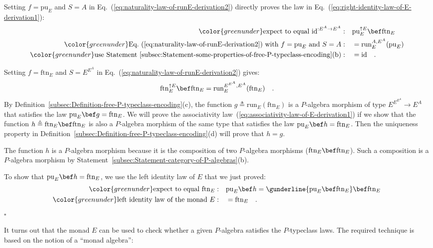 Setting $f=\text{pu}_{E}$ and $S=A$ in Eq.~(\ref{eq:naturality-law-of-runE-derivation2})
directly proves the law in Eq.~(\ref{eq:right-identity-law-of-E-derivation1}):
\begin{align*}
{\color{greenunder}\text{expect to equal }\text{id}^{:E^{A}\rightarrow E^{A}}:}\quad & \text{pu}_{E}^{\uparrow E}\bef\text{ftn}_{E}\\
{\color{greenunder}\text{Eq.~(\ref{eq:naturality-law-of-runE-derivation2}) with }f=\text{pu}_{E}\text{ and }S=A:}\quad & =\text{run}_{E}^{A,E^{A}}(\text{pu}_{E})\\
{\color{greenunder}\text{use Statement~\ref{subsec:Statement-some-properties-of-free-P-typeclass-encoding}(b)}:}\quad & =\text{id}\quad.
\end{align*}

Setting $f=\text{ftn}_{E}$ and $S=E^{E^{A}}$ in Eq.~(\ref{eq:naturality-law-of-runE-derivation2})
gives:
\[
\text{ftn}_{E}^{\uparrow E}\bef\text{ftn}_{E}=\text{run}_{E}^{E^{E^{A}},E^{A}}(\text{ftn}_{E})\quad.
\]
By Definition~\ref{subsec:Definition-free-P-typeclass-encoding}(c),
the function $g\triangleq\text{run}_{E}(\text{ftn}_{E})$ is a $P$-algebra
morphism of type $E^{E^{E^{A}}}\rightarrow E^{A}$ that satisfies
the law $\text{pu}_{E}\bef g=\text{ftn}_{E}$. We will prove the associativity
law~(\ref{eq:associativity-law-of-E-derivation1}) if we show that
the function $h\triangleq\text{ftn}_{E}\bef\text{ftn}_{E}$ is also
a $P$-algebra morphism of the same type that satisfies the law $\text{pu}_{E}\bef h=\text{ftn}_{E}$.
Then the uniqueness property in Definition~\ref{subsec:Definition-free-P-typeclass-encoding}(d)
will prove that $h=g$. 

The function $h$ is a $P$-algebra morphism because it is the composition
of two $P$-algebra morphisms ($\text{ftn}_{E}\bef\text{ftn}_{E}$).
Such a composition is a $P$-algebra morphism by Statement~\ref{subsec:Statement-category-of-P-algebras}(b).

To show that $\text{pu}_{E}\bef h=\text{ftn}_{E}$, we use the left
identity law of $E$ that we just proved:
\begin{align*}
{\color{greenunder}\text{expect to equal }\text{ftn}_{E}:}\quad & \text{pu}_{E}\bef h=\gunderline{\text{pu}_{E}\bef\text{ftn}_{E}}\bef\text{ftn}_{E}\\
{\color{greenunder}\text{left identity law of the monad }E:}\quad & =\text{ftn}_{E}\quad.
\end{align*}
$\square$

It turns out that the monad $E$ can be used to check whether a given
$P$-algebra satisfies the $P$-typeclass laws. The required technique
is based on the notion of a \textsf{``}monad algebra\textsf{''}:


